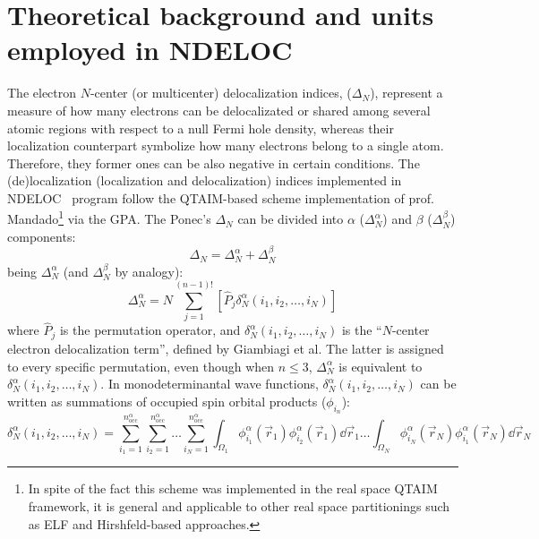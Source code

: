 \documentclass[a4paper,11pt,openany]{memoir}
\newcommand\programa{\textsc{NDELOC}}
\begin{document}
\chapter[Theor. background and units]{Theoretical background and units employed in \programa}\label{chap:teo}
The electron $N$-center (or multicenter) delocalization indices, ($\varDelta_N$), represent a measure of how many electrons can be delocalizated or shared among several atomic regions with respect to a null Fermi hole density, whereas their localization counterpart symbolize how many electrons belong to a single atom. Therefore, they former ones can be also negative in certain conditions. The (de)localization (localization and delocalization) indices implemented in \programa~ program follow the \acs{QTAIM}-based scheme implementation of prof. Mandado\autocite{QTAIMncenterdelocalizationMGM2007,ChemicalgraphtheoryMGM2007}\footnote{In spite of the fact this scheme was implemented in the real space \ac{QTAIM} framework, it is general and applicable to other real space partitionings such as \ac{ELF} and Hirshfeld-based approaches.} via the \ac{GPA}\autocite{MulticenterbondindicesBPD2005}. The Ponec's $\varDelta_N$ can be divided into $\alpha$ ($\varDelta^{\alpha}_N$) and $\beta$ ($\varDelta^{\beta}_N$) components:
\begin{equation}
	\varDelta_N = \varDelta^{\alpha}_N + \varDelta^{\beta}_N
\end{equation}
being $\varDelta^{\alpha}_N$ (and $\varDelta^{\beta}_N$ by analogy):
\begin{equation}
	\varDelta^{\alpha}_N = N \sum_{j=1}^{(n-1)!}\left[\hat{P}_j\delta_N^{\alpha}(i_1,i_2,\ldots,i_N)\right]
\end{equation}
where $\hat{P}_j$ is the permutation operator, and $\delta_N^{\alpha}(i_1,i_2,\ldots,i_N)$ is the ``$N$-center electron delocalization term'', defined by Giambiagi et al\autocite{DefinitionmulticenterbondGGM1990,GraphicallinkingMOBGG2000,GraphicalLinkingMOBGG2001}. The latter is assigned to every specific permutation, even though when $n\le3$, $\varDelta^{\alpha}_N$ is
equivalent to $\delta_N^{\alpha}(i_1,i_2,\ldots,i_N)$. In monodeterminantal wave functions, $\delta_N^{\alpha}(i_1,i_2,\ldots,i_N)$ can be written as summations of occupied spin orbital products ($\phi_{i_n}$):
\begin{equation}
	\delta_N^{\alpha}(i_1,i_2,\ldots,i_N) = \sum_{i_1=1}^{n_{\text{occ}}^{\alpha}}\sum_{i_2=1}^{n_{\text{occ}}^{\alpha}}\ldots\sum_{i_N=1}^{n_{\text{occ}}^{\alpha}}
	\int_{\Omega_1}
		\phi_{i_1}^{\alpha}(\vec{r}_1)\phi_{i_2}^{\alpha}(\vec{r}_1)\dd{\vec{r}_1}
	\ldots
	\int_{\Omega_N}
		\phi_{i_N}^{\alpha}(\vec{r}_N)\phi_{i_1}^{\alpha}(\vec{r}_N)\dd{\vec{r}_N}
\end{equation}
\end{document}
